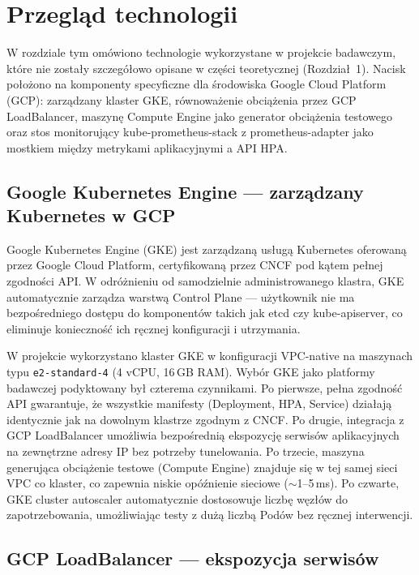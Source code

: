 \chapter{Przegląd technologii}

W rozdziale tym omówiono technologie wykorzystane w projekcie badawczym, które nie zostały szczegółowo opisane w części teoretycznej (Rozdział~1). Nacisk położono na komponenty specyficzne dla środowiska Google Cloud Platform (GCP): zarządzany klaster GKE, równoważenie obciążenia przez GCP LoadBalancer, maszynę Compute Engine jako generator obciążenia testowego oraz stos monitorujący kube-prometheus-stack z prometheus-adapter jako mostkiem między metrykami aplikacyjnymi a API HPA.

\section{Google Kubernetes Engine --- zarządzany Kubernetes w GCP}

Google Kubernetes Engine (GKE) jest zarządzaną usługą Kubernetes oferowaną przez Google Cloud Platform, certyfikowaną przez CNCF pod kątem pełnej zgodności API. W odróżnieniu od samodzielnie administrowanego klastra, GKE automatycznie zarządza warstwą Control Plane --- użytkownik nie ma bezpośredniego dostępu do komponentów takich jak etcd czy kube-apiserver, co eliminuje konieczność ich ręcznej konfiguracji i utrzymania.

W projekcie wykorzystano klaster GKE w konfiguracji VPC-native na maszynach typu \texttt{e2-standard-4} (4 vCPU, 16\,GB RAM). Wybór GKE jako platformy badawczej podyktowany był czterema czynnikami. Po pierwsze, pełna zgodność API gwarantuje, że wszystkie manifesty (Deployment, HPA, Service) działają identycznie jak na dowolnym klastrze zgodnym z CNCF. Po drugie, integracja z GCP LoadBalancer umożliwia bezpośrednią ekspozycję serwisów aplikacyjnych na zewnętrzne adresy IP bez potrzeby tunelowania. Po trzecie, maszyna generująca obciążenie testowe (Compute Engine) znajduje się w tej samej sieci VPC co klaster, co zapewnia niskie opóźnienie sieciowe ($\sim$1--5\,ms). Po czwarte, GKE cluster autoscaler automatycznie dostosowuje liczbę węzłów do zapotrzebowania, umożliwiając testy z dużą liczbą Podów bez ręcznej interwencji.

\section{GCP LoadBalancer --- ekspozycja serwisów}

